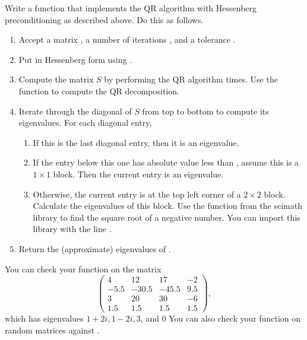 \begin{problem}
Write a function that implements the QR algorithm with Hessenberg preconditioning as described above.
Do this as follows.
\begin{enumerate}
\item Accept a matrix , a number of iterations , and a tolerance .
\item Put  in Hessenberg form using .
\item Compute the matrix $S$ by performing the QR algorithm  times.
Use the function  to compute the QR decomposition.
\item Iterate through the diagonal of $S$ from top to bottom to compute its eigenvalues.
For each diagonal entry,
\begin{enumerate}
\item If this is the last diagonal entry, then it is an eigenvalue.
\item If the entry below this one has absolute value less than , assume this is a $1\times 1$ block.
Then the current entry is an eigenvalue.
\item Otherwise, the current entry is at the top left corner of a $2 \times 2$ block.
Calculate the eigenvalues of this block.
Use the  function from the scimath library to find the square root of a negative number.
You can import this library with the line .
\end{enumerate}
\item Return the (approximate) eigenvalues of .
\end{enumerate}
You can check your function on the matrix
\[
\begin{pmatrix}
 4 &  12 & 17 &  -2 \\
-5.5& -30.5 & -45.5 &  9.5\\
 3
&  20
& 30
&  -6
\\
1.5 &  1.5&   1.5&   1.5
       \end{pmatrix},
\]
which has eigenvalues $1+2i, 1-2i, 3$, and 0
You can also check your function on random matrices against .
\label{prob:qr_solver}
\end{problem}

